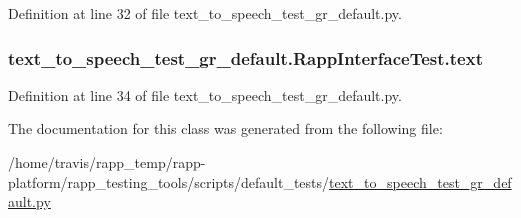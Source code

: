 Definition at line 32 of file text\-\_\-to\-\_\-speech\-\_\-test\-\_\-gr\-\_\-default.\-py.

\hypertarget{classtext__to__speech__test__gr__default_1_1RappInterfaceTest_a2cdfe9a0733031bc888b05dc9b6f7c56}{
\subsubsection[{text}]{\setlength{\rightskip}{0pt plus 5cm}text\-\_\-to\-\_\-speech\-\_\-test\-\_\-gr\-\_\-default.\-Rapp\-Interface\-Test.\-text}}\label{classtext__to__speech__test__gr__default_1_1RappInterfaceTest_a2cdfe9a0733031bc888b05dc9b6f7c56}


Definition at line 34 of file text\-\_\-to\-\_\-speech\-\_\-test\-\_\-gr\-\_\-default.\-py.



The documentation for this class was generated from the following file\-:\begin{DoxyCompactItemize}
\item 
/home/travis/rapp\-\_\-temp/rapp-\/platform/rapp\-\_\-testing\-\_\-tools/scripts/default\-\_\-tests/\hyperlink{text__to__speech__test__gr__default_8py}{text\-\_\-to\-\_\-speech\-\_\-test\-\_\-gr\-\_\-default.\-py}\end{DoxyCompactItemize}
